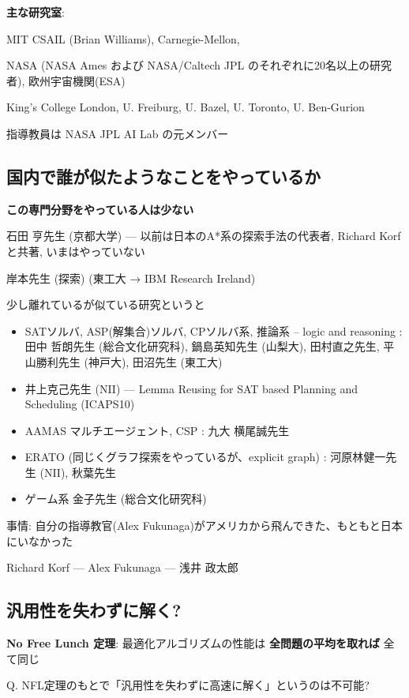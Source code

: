 \textbf{主な研究室}:

MIT CSAIL (Brian Williams), Carnegie-Mellon, 

NASA (NASA Ames および NASA/Caltech JPL のそれぞれに20名以上の研究者), 欧州宇宙機関(ESA)

King's College London, U. Freiburg, U. Bazel, U. Toronto, U. Ben-Gurion

指導教員は NASA JPL AI Lab の元メンバー

\subsection{国内で誰が似たようなことをやっているか}
\label{sec:orgheadline62}

\textbf{この専門分野をやっている人は少ない}

石田 亨先生 (京都大学) --- 以前は日本のA*系の探索手法の代表者, Richard Korf と共著, いまはやっていない

岸本先生 (探索) (東工大 → IBM Research Ireland)

少し離れているが似ている研究というと

\begin{itemize}
\item SATソルバ, ASP(解集合)ソルバ, CPソルバ系, 推論系 -- logic and reasoning :
田中 哲朗先生 (総合文化研究科), 鍋島英知先生 (山梨大), 田村直之先生, 平山勝利先生 (神戸大), 田沼先生 (東工大)
\item 井上克己先生 (NII) --- Lemma Reusing for SAT based Planning and Scheduling (ICAPS10)
\item AAMAS マルチエージェント, CSP : 九大 横尾誠先生
\item ERATO (同じくグラフ探索をやっているが、explicit graph) : 河原林健一先生 (NII), 秋葉先生
\item ゲーム系 金子先生 (総合文化研究科)
\end{itemize}

事情: 自分の指導教官(Alex Fukunaga)がアメリカから飛んできた、もともと日本にいなかった

Richard Korf --- Alex Fukunaga --- 浅井 政太郎

\subsection{汎用性を失わずに解く?}
\label{sec:orgheadline63}

\textbf{No Free Lunch 定理}: 最適化アルゴリズムの性能は \textbf{全問題の平均を取れば} 全て同じ

Q. NFL定理のもとで「汎用性を失わずに高速に解く」というのは不可能?

